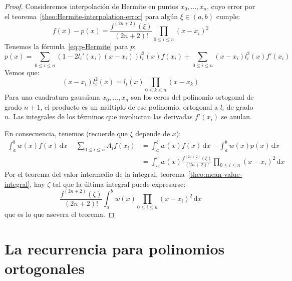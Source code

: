  \begin{proof}
    Consideremos interpolación de Hermite en puntos \(x_0, \dotsc, x_n\),
    cuyo error por el teorema~\ref{theo:Hermite-interpolation-error}
    para algún \(\xi \in (a, b)\) cumple:
    \begin{equation*}
      f(x) - p(x)
        = \frac{f^{(2 n + 2)}(\xi)}{(2 n + 2)!} \prod_{0 \le i \le n} (x - x_i)^2
    \end{equation*}
    Tenemos la fórmula~\eqref{eq:p-Hermite} para \(p\):
    \begin{equation}
      p(x)
        = \sum_{0 \le i \le n} \left( 1 - 2 l_i'(x_i) (x - x_i) \right)
                               l_i^2(x) f(x_i)
            + \sum_{0 \le i \le n} (x - x_i) l_i^2(x) f'(x_i)
    \end{equation}
    Vemos que:
    \begin{equation*}
      (x - x_i) l_i^2(x)
        = l_i(x) \prod_{0 \le k \le n} (x - x_k)
    \end{equation*}
    Para una cuadratura gaussiana
    \(x_0, \dotsc, x_n\)
    son los ceros del polinomio ortogonal de grado \(n + 1\),
    el producto es un múltiplo de ese polinomio,
    ortogonal a \(l_i\) de grado \(n\).
    Las integrales de los términos
    que involucran las derivadas \(f'(x_i)\) se anulan.

    En consecuencia,
    tenemos
    (recuerde que \(\xi\) depende de \(x\)):
    \begin{align*}
      \int_a^b w(x) f(x) \, \mathrm{d} x
        - \sum_{0 \le i \le n} A_i f(x_i)
        &= \int_a^b w(x) f(x) \, \mathrm{d} x
             - \int_a^b w(x) p(x) \, \mathrm{d} x \\
        &=  \int_a^b w(x) \frac{f^{(2 n + 2)}(\xi)}{(2 n + 2)!}
              \prod_{0 \le i \le n} (x - x_i)^2 \, \mathrm{d} x
    \end{align*}
    Por el teorema del valor intermedio de la integral,
    teorema~\ref{theo:mean-value-integral},
    hay \(\zeta\) tal que la última integral puede expresarse:
    \begin{equation*}
      \frac{f^{(2 n + 2)}(\zeta)}{(2 n + 2)!}
         \int_a^b w(x) \prod_{0 \le i \le n} (x - x_i)^2 \, \mathrm{d} x
    \end{equation*}
    que es lo que asevera el teorema.
  \end{proof}

\section{La recurrencia para polinomios ortogonales}
\label{sec:recurrencia-polinomios-ortogonales}

